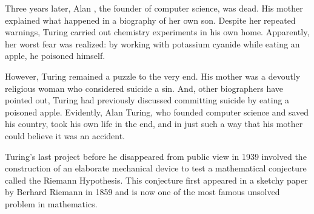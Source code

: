 Three years later, Alan , the founder of computer science, was
dead.  His mother explained what happened in a biography of her own
son.  Despite her repeated warnings, Turing carried out chemistry
experiments in his own home.  Apparently, her worst fear was realized:
by working with potassium cyanide while eating an apple, he poisoned
himself.

However, Turing remained a puzzle to the very end.  His mother was a
devoutly religious woman who considered suicide a sin.  And, other
biographers have pointed out, Turing had previously discussed
committing suicide by eating a poisoned apple.  Evidently, Alan
Turing, who founded computer science and saved his country, took his
own life in the end, and in just such a way that his mother could
believe it was an accident.

Turing's last project before he disappeared from public view in 1939
involved the construction of an elaborate mechanical device to test a
mathematical conjecture called the Riemann Hypothesis.  This conjecture
first appeared in a sketchy paper by Berhard Riemann in 1859 and is now
one of the most famous unsolved problem in mathematics.

